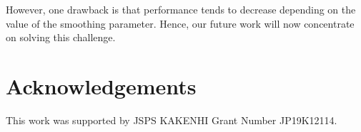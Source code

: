 \documentclass[a4paper,11pt]{report}
\theoremstyle{mytheoremstyle}
\begin{document}
However, one drawback is that performance tends to decrease depending on the value of the smoothing parameter. Hence, our future work will now concentrate on solving this challenge.


\chapter*{Acknowledgements}
This work was supported by JSPS KAKENHI Grant Number JP19K12114.



\end{document}
